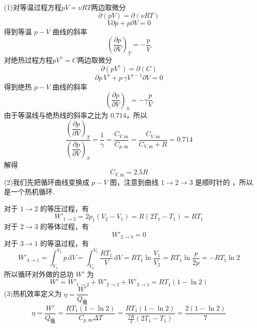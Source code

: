 \begin{solution}
    (1)对等温过程方程$pV = \nu RT$两边取微分
    $$
        \partial{(pV)} = \partial{(\nu RT)}
    $$
    $$
        V \partial{p} + p \partial{V} = 0
    $$
    得到等温 $p-V$ 曲线的斜率
    $$
        \left( \frac{\partial p}{\partial V} \right)_T = -\frac{p}{V}
    $$
    对绝热过程方程$pV^{\gamma} = C$两边取微分
    $$
        \partial \left(pV^{\gamma}\right) = \partial(C)
    $$
    $$
        \partial{p} \, V^\gamma + p \, \gamma V^{\gamma - 1} \partial{V} = 0
    $$
    得到绝热 $p-V$ 曲线的斜率
    $$
        \left( \frac{\partial p}{\partial V} \right)_S = -\gamma \frac{p}{V}
    $$
    由于等温线与绝热线的斜率之比为 $0.714$，所以
    $$
        \frac{
            \left(\dfrac{\partial p}{\partial V}\right)_T
        }{
            \left(\dfrac{\partial p}{\partial V}\right)_S
        }
        =\frac{1}{\gamma}
        = \frac{ C_{V,\mathrm{m}} }{ C_{p,\mathrm{m}} }
        = \frac{ C_{V,\mathrm{m}} }{ C_{V,\mathrm{m}} + R }
        = 0.714
    $$
    解得
    $$
        C_{V,\mathrm{m}} = 2.5R
    $$
    (2)我们先把循环曲线变换成 $p-V$ 图，注意到曲线 $1 \to 2 \to 3$ 是顺时针的 ，所以是一个热机循环.
    \begin{center}
    \end{center}
    对于 $1 \to 2$ 的等压过程，有
    $$
        W'_{1 \to 2} = 2p_1(V_2 - V_1) = R(2T_1 - T_1) = RT_1
    $$
    对于 $2 \to 3$ 的等体过程，有
    $$
        W'_{2 \to 3} = 0
    $$
    对于 $3 \to 1$ 的等温过程，有
    $$
        W'_{3 \to 1}
        = \int_{V_2}^{V_1} p \,\mathrm{d}V
        = \int_{V_2}^{V_1} \frac{RT_1}{V} \,\mathrm{d}V
        = RT_1\ln\frac{V_1}{V_2}
        = RT_1\ln\frac{p}{2p}
        = - RT_1\ln2
    $$
    所以循环对外做的总功 $W'$ 为
    $$
        W' = W'_{1 \to 2} + W'_{2 \to 3} + W'_{3 \to 1} = RT_1 (1-\ln2)
    $$
    (3)热机效率定义为 $\eta = \dfrac{W'}{Q_\text{吸}}$
    $$
        \eta = \dfrac{W'}{Q_\text{吸}} = \frac{RT_1 (1-\ln2)}{C_{p,\mathrm{m}}\Delta T}
        = \frac{ RT_1 (1-\ln2) }{ \frac{7R}{2}(2T_1 - T_1) }
        = \frac{2(1-\ln2)}{7}
    $$
\end{solution}

